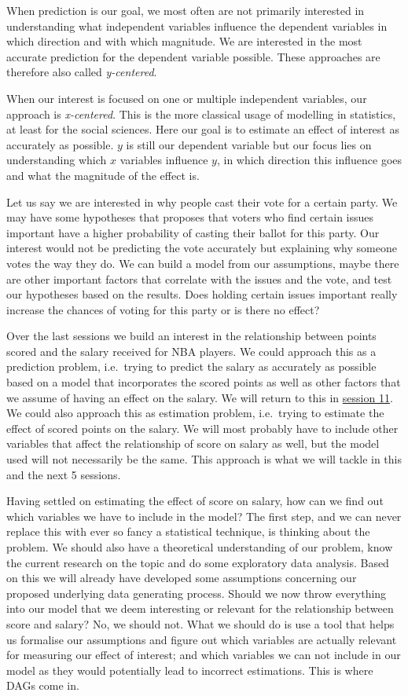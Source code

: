 \documentclass[
]{book}
\begin{document}
When prediction is our goal, we most often are not primarily interested in
understanding what independent variables influence the dependent variables in
which direction and with which magnitude. We are interested in the most accurate
prediction for the dependent variable possible. These approaches are therefore
also called \emph{y-centered}.

When our interest is focused on one or multiple independent variables, our
approach is \emph{x-centered}. This is the more classical usage of modelling in
statistics, at least for the social sciences.
Here our goal is to estimate an effect of interest as accurately as possible.
\(y\) is still our dependent variable but our focus lies on understanding which
\(x\) variables influence \(y\), in which direction this influence goes and what the
magnitude of the effect is.

Let us say we are interested in why people cast their vote for a certain party.
We may have some hypotheses that proposes that voters who find certain issues
important have a higher probability of casting their ballot for this party. Our
interest would not be predicting the vote accurately but explaining why someone
votes the way they do. We can build a model from our assumptions, maybe there
are other important factors that correlate with the issues and the vote, and
test our hypotheses based on the results. Does holding certain issues important
really increase the chances of voting for this party or is there no effect?

Over the last sessions we build an interest in the relationship between points
scored and the salary received for NBA players. We could approach this as a
prediction problem, i.e.~trying to predict the salary as accurately as possible
based on a model that incorporates the scored points as well as other factors
that we assume of having an effect on the salary. We will return to this in
\protect\hyperlink{pm-t}{session 11}. We could also approach this as estimation problem, i.e.~trying to
estimate the effect of scored points on the salary. We will most probably have
to include other variables that affect the relationship of score on salary as
well, but the model used will not necessarily be the same. This approach is what
we will tackle in this and the next 5 sessions.

Having settled on estimating the effect of score on salary, how can we find out
which variables we have to include in the model? The first step, and we can
never replace this with ever so fancy a statistical technique, is thinking about
the problem. We should also have a theoretical understanding of our problem,
know the current research on the topic and do some exploratory data analysis.
Based on this we will already have developed some assumptions concerning our
proposed underlying data generating process. Should we now throw everything into
our model that we deem interesting or relevant for the relationship between
score and salary? No, we should not. What we should do is use a tool that helps
us formalise our assumptions and figure out which variables are actually
relevant for measuring our effect of interest; and which variables we can not
include in our model as they would potentially lead to incorrect estimations.
This is where DAGs come in.
\end{document}
